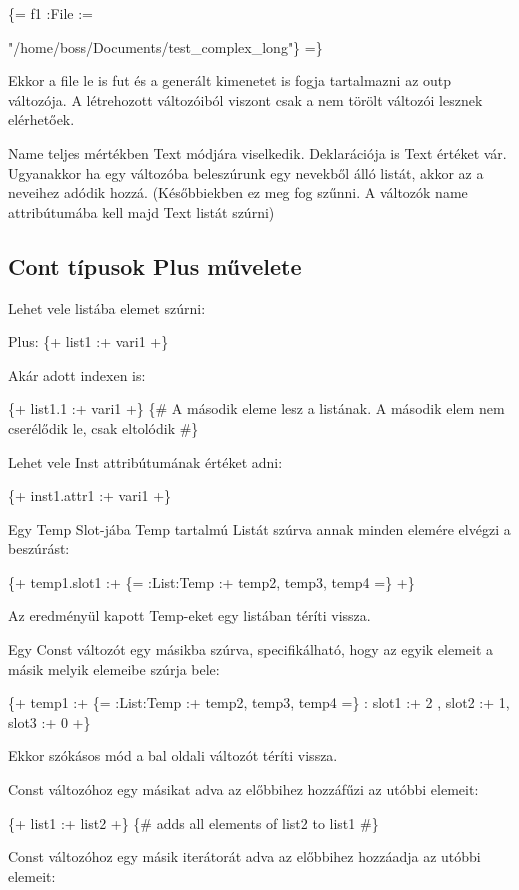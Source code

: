 \{= f1 :File := {"/home/boss/Documents/test\_complex\_long"\} =\}

Ekkor a file le is fut és a generált kimenetet is fogja tartalmazni az outp változója.
A létrehozott változóiból viszont csak a nem törölt változói lesznek elérhetőek.

Name teljes mértékben Text módjára viselkedik. 
Deklarációja is Text értéket vár. 
Ugyanakkor ha egy változóba beleszúrunk egy nevekből álló listát, akkor az a neveihez adódik hozzá. 
(Későbbiekben ez meg fog szűnni. 
A változók name attribútumába kell majd Text listát szúrni)



\subsection{Cont típusok Plus művelete}
Lehet vele listába elemet szúrni:

Plus: \{+ list1 :+ vari1 +\}

Akár adott indexen is:

\{+ list1.1 :+ vari1 +\} 
\{\# A második eleme lesz a listának. 
A második elem nem cserélődik le, csak eltolódik \#\}

Lehet vele Inst attribútumának értéket adni:

\{+ inst1.attr1 :+ vari1 +\} 

Egy Temp Slot-jába Temp tartalmú Listát szúrva annak minden elemére elvégzi a beszúrást:

\{+ temp1.slot1 :+ \{= :List:Temp :+ temp2, temp3, temp4 =\} +\} 

Az eredményül kapott Temp-eket egy listában téríti vissza.
 
Egy Const változót egy másikba szúrva, specifikálható, hogy az egyik elemeit a másik melyik elemeibe szúrja bele:

\{+ temp1 :+ \{= :List:Temp :+ temp2, temp3, temp4 =\} : slot1 :+ 2 , slot2 :+ 1, slot3 :+ 0   +\} 

Ekkor szókásos mód a bal oldali változót téríti vissza. 

Const változóhoz egy másikat adva az előbbihez hozzáfűzi az utóbbi elemeit:

\{+ list1 :+ list2 +\} \{\# adds all elements of list2 to list1 \#\}

Const változóhoz egy másik iterátorát adva az előbbihez hozzáadja az utóbbi elemeit:

}
